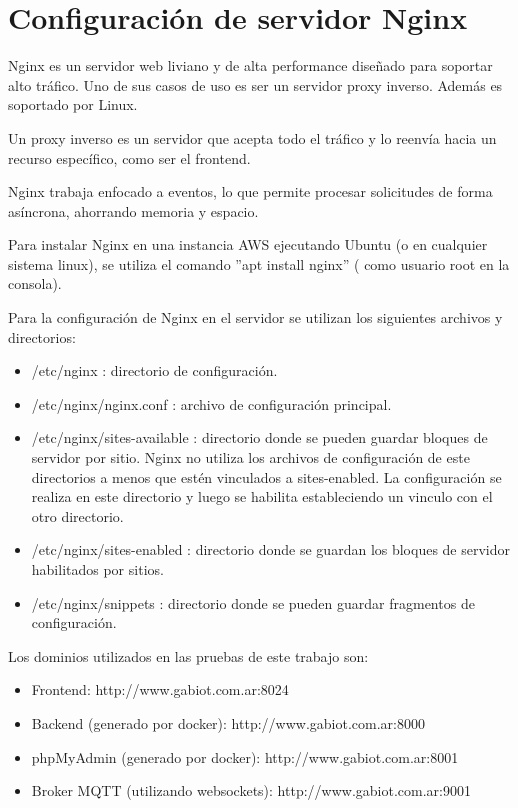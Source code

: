 
\chapter{Configuración de servidor Nginx} %

\label{AppendixB} %

Nginx \citep{WEBSITE:36} es un servidor web liviano y de alta performance diseñado para soportar alto tráfico. Uno de sus casos de uso es ser un servidor proxy inverso. Además es soportado por Linux.

Un proxy inverso es un servidor que acepta todo el tráfico y lo reenvía hacia un recurso específico, como ser el frontend.

Nginx trabaja enfocado a eventos, lo que permite procesar solicitudes de forma asíncrona, ahorrando memoria y espacio.

Para instalar Nginx en una instancia AWS ejecutando Ubuntu (o en cualquier sistema linux), se utiliza el comando ''apt install nginx'' ( como usuario root en la consola).

Para la configuración de Nginx en el servidor se utilizan los siguientes archivos y directorios:
\begin{itemize}
\item /etc/nginx : directorio de configuración.
\item /etc/nginx/nginx.conf : archivo de configuración principal.
\item /etc/nginx/sites-available : directorio donde se pueden guardar bloques de servidor por sitio. Nginx no utiliza los archivos de configuración de este directorios a menos que estén vinculados a sites-enabled. La configuración se realiza en este directorio y luego se habilita estableciendo un vinculo con el otro directorio.
\item /etc/nginx/sites-enabled : directorio donde se guardan los bloques de servidor habilitados por sitios. 
\item /etc/nginx/snippets : directorio donde se pueden guardar fragmentos de configuración.
\end{itemize}

Los dominios utilizados en las pruebas de este trabajo son:

\begin{itemize}
\item Frontend: http://www.gabiot.com.ar:8024
\item Backend (generado por docker): http://www.gabiot.com.ar:8000
\item phpMyAdmin (generado por docker): http://www.gabiot.com.ar:8001
\item Broker MQTT (utilizando websockets): http://www.gabiot.com.ar:9001
\end{itemize}

